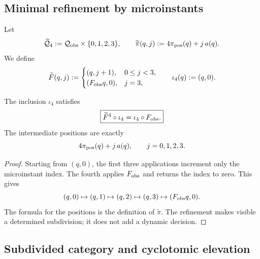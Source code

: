 \subsection{Minimal refinement by microinstants}

\begin{definition}
\label{p12-83-c1-s12:def:u006c-estado-subdividido}
Let
\begin{equation}
 \widetilde{\mathcal Q}_4
 :=\mathcal Q_{\rm obs}\times\{0,1,2,3\},
 \qquad
 \widetilde\pi(q,j)
 :=4\pi_{\rm pos}(q)+j\,a(q).
 \label{p12-83-c1-s12:eq:u006c-estado-refinado}
\end{equation}
We define
\begin{equation}
 \widetilde F(q,j):=
 \begin{cases}
  (q,j+1),&0\leq j<3,\\
  (F_{\rm obs}q,0),&j=3,
 \end{cases}
 \qquad
 \iota_4(q):=(q,0).
 \label{p12-83-c1-s12:eq:u006c-dinamica-refinada}
\end{equation}
\end{definition}

\begin{theorem}
\label{p12-83-c1-s12:thm:u006c-semiconjugacion}
The inclusion \(\iota_4\) satisfies
\begin{equation}
 \boxed{
 \widetilde F^4\circ\iota_4
 =\iota_4\circ F_{\rm obs}.}
 \label{p12-83-c1-s12:eq:u006c-semiconjugacion}
\end{equation}
The intermediate positions are exactly
\[
 4\pi_{\rm pos}(q)+j\,a(q),
 \qquad j=0,1,2,3.
\]
\end{theorem}

\begin{proof}
Starting from \((q,0)\), the first three applications increment only the
microinstant index. The fourth applies \(F_{\rm obs}\) and returns the index to
zero. This gives
\[
 (q,0)\mapsto(q,1)\mapsto(q,2)\mapsto(q,3)
 \mapsto(F_{\rm obs}q,0).
\]
The formula for the positions is the definition of
\(\widetilde\pi\). The refinement makes visible a determined subdivision;
it does not add a dynamic decision.
\end{proof}

\subsection{Subdivided category and cyclotomic elevation}

